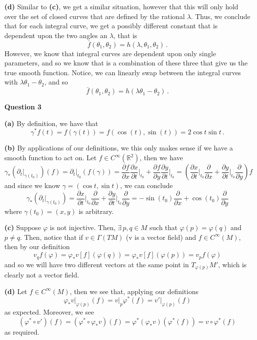 \documentclass[10pt]{article}
\newcommand{\R}{\mathbb{R}}
\newcommand{\di}[2][]{\frac{\partial #1}{\partial #2}}
\begin{document}
\textbf{(d)} Similar to \textbf{(c)}, we get a similar situation, however that this will only hold over the set of closed curves that are defined by the rational $\lambda$. Thus, we conclude that for each integral curve, we get a possibly different constant that is dependent upon the two angles an $\lambda$, that is
\[ \bar{f}(\theta_{1},\theta_{2}) = h(\lambda,\theta_{1},\theta_{2})\, .\]
However, we know that integral curves are dependent upon only single parameters, and so we know that is a combination of these three that give us the true smooth function. Notice, we can linearly swap between the integral curves with $\lambda\theta_{1} - \theta_{2}$, and so
\[ \bar{f}(\theta_{1},\theta_{2}) = h(\lambda\theta_{1} -\theta_{2})\, .\]

\newpage
\textbf{Question 3}

\textbf{(a)} By definition, we have that
\[ \gamma^{*}f(t) = f(\gamma(t)) = f(\cos(t),\sin(t)) = 2\cos t\sin t \, .\]

\textbf{(b)} By applications of our definitions, we this only makes sense if we have a smooth function to act on. Let $f\in C^{\infty}(\R^{2})$, then we have
\[ \gamma_{*}\left(\partial_{t}\biggr\rvert_{\gamma(t_{0})}\right)(f) = \partial_{t}\biggr\rvert_{t_{0}}(f(\gamma)) = \frac{\partial f}{\partial x}\di[x]{t}\biggr\rvert_{t_{0}} + \di[f]{y}\di[y]{t}\biggr\rvert_{t_{0}} = \left(\di[x]{t}\biggr\rvert_{t_{0}}\di{x} + \di[y]{t}\biggr\rvert_{t_{0}}\di{y}\right)f \]
and since we know $\gamma = (\cos t,\sin t)$, we can conclude
\[ \gamma_{*}\left(\partial_{t}\biggr\rvert_{\gamma(t_{0})}\right) = \di[x]{t}\biggr\rvert_{t_{0}}\di{x} + \di[y]{t}\biggr\rvert_{t_{0}}\di{y} = -\sin(t_{0})\di{x} + \cos(t_{0})\di{y} \]
where $\gamma(t_{0}) = (x,y)$ is arbitrary.

\textbf{(c)} Suppose $\varphi$ is not injective. Then, $\exists\, p, q \in M$ such that $\varphi(p)= \varphi(q)$ and $p\neq q$. Then, notice that if $v \in \Gamma(TM)$ (v is a vector field) and $f \in C^{\infty}(M)$, then by our definition
\[v_{q}f(\varphi) =  \varphi_{*}v[f](\varphi(q)) = \varphi_{*}v[f](\varphi(p)) = v_{p}f(\varphi) \]
and so we will have two different vectors at the same point in $T_{\varphi(p)}M'$, which is clearly not a vector field.

\textbf{(d)} Let $f \in C^{\infty}(M)$, then we see that, applying our definitions
\[ \varphi_{*}v\biggr\rvert_{\varphi(p)}(f) = v\biggr\rvert_{p}\varphi^{*}(f) = v'\biggr\rvert_{\varphi(p)}(f) \]
as expected. Moreover, we see
\[ (\varphi^{*}\circ v')(f) = (\varphi^{*}\circ \varphi_{*}v)(f) = \varphi^{*}(\varphi_{*}v)(\varphi^{*}(f)) = v\circ \varphi^{*}(f) \]
as required.
\end{document}
